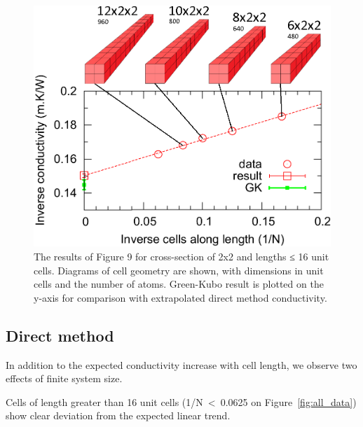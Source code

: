 \documentclass[%
preprint,                                  %
nofootinbib,
 amsmath,amssymb,
 aps,
]{revtex4-1}
\begin{document}
\begin{figure}[h!]
  \includegraphics[width=\linewidth]{images/gk-direct.png}
  \caption{The results of Figure 9 for cross-section of 2x2 and lengths ≤ 16 unit cells. Diagrams of cell geometry are shown, with dimensions in unit cells and the number of atoms. Green-Kubo result is plotted on the y-axis for comparison with extrapolated direct method conductivity.}
  \label{fig:gk-direct}
\end{figure}



\subsection{\label{sec:results.direct}Direct method}

In addition to the expected conductivity increase with cell length, we observe two effects of finite system size.

Cells of length greater than 16 unit cells (1/N~\textless~0.0625 on Figure~\ref{fig:all_data}) show clear deviation from the expected linear trend.
\end{document}
